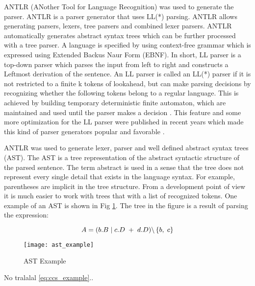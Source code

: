 ANTLR (ANother Tool for Language Recognition) was used to generate the parser. ANTLR is a 
parser generator that uses LL(*) parsing. ANTLR allows generating parsers, lexers, tree 
parsers and combined lexer parsers. ANTLR automatically generates abstract syntax trees
which can be further processed with a tree parser. A language is specified by using context-free
grammar which is expressed using Extended Backus Naur Form (EBNF). In short, LL parser is a 
top-down parser which parses the input from left to right and constructs a Leftmost derivation 
of the sentence. An LL parser is called an LL(*) parser if it is not restricted to a finite k 
tokens of lookahead, but can make parsing decisions by recognizing whether the following tokens
belong to a regular language. This is achieved by building temporary deterministic finite
automaton, which are maintained and used until the parser makes a decision \cite{ANTLRRef}. This feature and
some more optimization for the LL parser were published in recent years which made this kind 
of parser generators popular and favorable \cite{NiklausWirth}.

ANTLR was used to generate lexer, parser and well defined abstract syntax trees (AST). The AST
is a tree representation of the abstract syntactic structure of the parsed sentence. The term
abstract is used in a sense that the tree does not represent every single detail that exists 
in the language syntax. For example, parentheses are implicit in the tree structure. From a 
development point of view it is much easier to work with trees that with a list of recognized
tokens. One example of an AST is shown in  Fig \ref{fig:ast_example}. The tree in the figure 
is a result of parsing the expression: 

\begin{equation}\label{eq:ccs_example}
 A=( b.B \hspace{1 mm} | \hspace{1 mm} c.D \hspace{1 mm} + \hspace{1 mm} d.D )
\backslash \left\lbrace b, \hspace{1 mm} c \right\rbrace 
\end{equation}

\begin{figure}[!t]
\centering
\texttt{[image: ast\_example]}
\caption{AST Example}
\label{fig:ast_example}
\end{figure}

No tralalal \ref{eq:ccs_example}..
